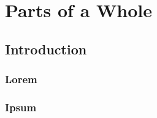 \documentclass{report}
\begin{document}

\toc

\part{Parts of a Whole}

\chapter{Introduction}

\section{Lorem}

\lipsum[1]

\section{Ipsum}

\lipsum[1]
\end{document}
